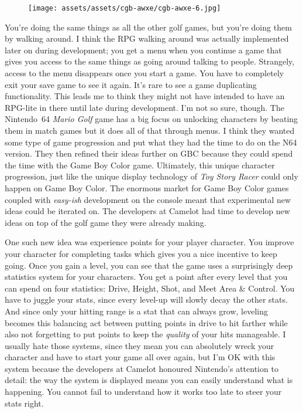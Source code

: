 \documentclass{book}
\begin{document}
\begin{figure}[hbt]
\vskip 10pt
\centering \texttt{[image: assets/assets/cgb-awxe/cgb-awxe-6.jpg]}
\vskip 6pt
\end{figure}
You’re doing the same things as all the other golf games, but you’re doing them by walking around. I think the RPG walking around was actually implemented later on during development; you get a menu when you continue a game that gives you access to the same things as going around talking to people. Strangely, access to the menu disappears once you start a game. You have to completely exit your save game to see it again. It’s rare to see a game duplicating functionality. This leads me to think they might not have intended to have an RPG-lite in there until late during development. I’m not so sure, though. The Nintendo 64 \emph{Mario Golf} game has a big focus on unlocking characters by beating them in match games but it does all of that through menus. I think they wanted some type of game progression and put what they had the time to do on the N64 version. They then refined their ideas further on GBC because they could spend the time with the Game Boy Color game. Ultimately, this unique character progression, just like the unique display technology of \emph{Toy Story Racer} could only happen on Game Boy Color. The enormous market for Game Boy Color games coupled with \emph{easy-ish} development on the console meant that experimental new ideas could be iterated on. The developers at Camelot had time to develop new ideas on top of the golf game they were already making.

One such new idea was experience points for your player character. You improve your character for completing tasks which gives you a nice incentive to keep going. Once you gain a level, you can see that the game uses a surprisingly deep statistics system for your characters. You get a point after every level that you can spend on four statistics: Drive, Height, Shot, and Meet Area \& Control. You have to juggle your stats, since every level-up will slowly decay the other stats. And since only your hitting range is a stat that can always grow, leveling becomes this balancing act between putting points in drive to hit farther while also not forgetting to put points to keep the \emph{quality} of your hits manageable. I usually hate those systems, since they mean you can absolutely wreck your character and have to start your game all over again, but I’m OK with this system because the developers at Camelot honoured Nintendo’s attention to detail: the way the system is displayed means you can easily understand what is happening. You cannot fail to understand how it works too late to steer your stats right.
\end{document}
